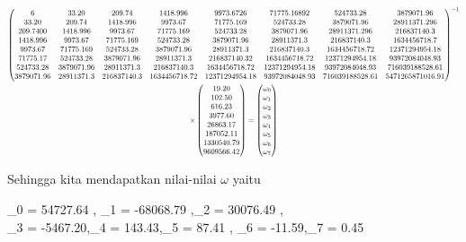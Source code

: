 \documentclass[12pt]{article}%
\begin{document}
\begin{enumerate}
\begin{enumerate}
\[		\scalemath{0.7}{
		\begin{gathered}
		\begin{pmatrix} 6 & 33.20 & 209.74 & 1418.996 & 9973.6726 & 71775.16892 & 524733.28 & 3879071.96\\ 33.20 & 209.74 & 1418.996 & 9973.67 & 71775.169 & 524733.28 & 3879071.96 & 28911371.296\\209.7400 & 1418.996 & 9973.67 & 71775.169 & 524733.28 & 3879071.96 & 28911371.296 & 216837140.3 \\ 1418.996 & 9973.67 & 71775.169 & 524733.28 & 3879071.96 & 28911371.3 & 216837140.3 & 1634456718.7 \\ 9973.67 & 71775.169 & 524733.28 & 3879071.96 & 28911371.3 & 216837140.3 & 1634456718.72 & 12371294954.18 \\ 71775.17 & 524733.28 & 3879071.96 & 28911371.3 & 216837140.32 & 1634456718.72 & 12371294954.18 & 93972084048.93 \\ 524733.28 & 3879071.96 & 28911371.3 & 216837140.3 & 1634456718.72 & 12371294954.18 & 93972084048.93 & 716039188528.61 \\ 3879071.96 & 28911371.3 & 216837140.3 & 1634456718.72 & 12371294954.18 & 93972084048.93 & 716039188528.61 & 5471265871016.91 \end{pmatrix}^{-1} \\ \times \begin{pmatrix} 19.20\\ 102.50\\ 616.23\\ 3977.60\\ 26863.17\\ 187052.11\\ 1330540.79\\ 9609566.42 \end{pmatrix}  = \begin{pmatrix} \omega_0\\ \omega_1\\ \omega_2\\ \omega_3\\ \omega_4\\ \omega_5\\ \omega_6 \\ \omega_7 \end{pmatrix}
		\end{gathered}
		}
		\]

		\par Sehingga kita mendapatkan nilai-nilai $\omega$ yaitu 

		\begin{gathered}
			\omega_0 = 54727.64 , \omega_1 = -68068.79 ,\omega_2 = 30076.49 , \\ \omega_3 = -5467.20,\omega_4 = 143.43,\omega_5 = 87.41 , \omega_6 = -11.59,\omega_7 = 0.45
		\end{gathered}


\end{enumerate}
\end{enumerate}
\end{document}
